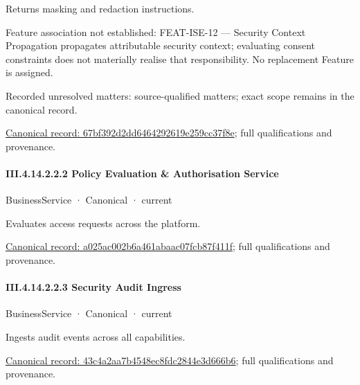 Returns masking and redaction instructions.



Feature association not established: FEAT-ISE-12 — Security Context Propagation propagates attributable security context; evaluating consent constraints does not materially realise that responsibility. No replacement Feature is assigned.


{\small Recorded unresolved matters: source-qualified matters; exact scope remains in the canonical record.}\par
{\footnotesize \href{../../../../../../../../continuum/business/business-service/67bf392d2dd6464292619e259cc37f8e.md}{Canonical record: 67bf392d2dd6464292619e259cc37f8e}; full qualifications and provenance.}\par
\paragraph*{III.4.14.2.2.2 Policy Evaluation \& Authorisation Service}
\label{navigation:III.4.14.2.2.2}

\label{element:a025ac002b6a461abaac07fcb87f411f}
{\small BusinessService · Canonical · current}\par

Evaluates access requests across the platform.


{\footnotesize \href{../../../../../../../../continuum/business/business-service/a025ac002b6a461abaac07fcb87f411f.md}{Canonical record: a025ac002b6a461abaac07fcb87f411f}; full qualifications and provenance.}\par
\paragraph*{III.4.14.2.2.3 Security Audit Ingress}
\label{navigation:III.4.14.2.2.3}

\label{element:43c4a2aa7b4548ec8fdc2844e3d666b6}
{\small BusinessService · Canonical · current}\par

Ingests audit events across all capabilities.


{\footnotesize \href{../../../../../../../../continuum/business/business-service/43c4a2aa7b4548ec8fdc2844e3d666b6.md}{Canonical record: 43c4a2aa7b4548ec8fdc2844e3d666b6}; full qualifications and provenance.}\par
